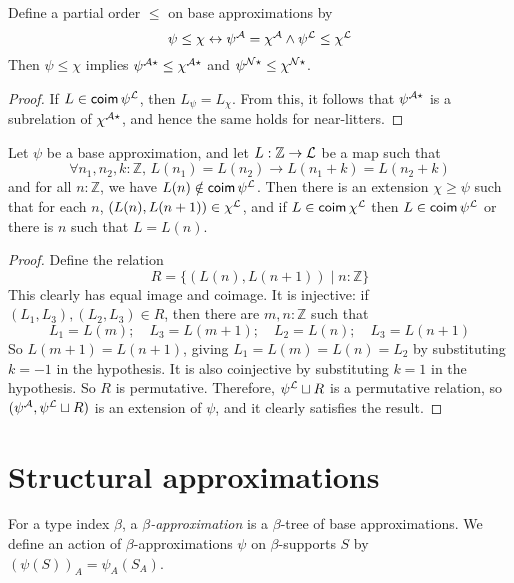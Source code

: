 \begin{proposition}
  Define a partial order \( \leq \) on base approximations by
  \[ \psi \leq \chi \leftrightarrow \psi^{\mathcal A} = \chi^{\mathcal A} \wedge \psi^{\mathcal L} \leq \chi^{\mathcal L} \]
  Then \( \psi \leq \chi \) implies \( \psi^{{\mathcal A}\star} \leq \chi^{{\mathcal A}\star} \) and \( \psi^{{\mathcal N}\star} \leq \chi^{{\mathcal N}\star} \).
\end{proposition}
\begin{proof}
  If \( L \in \operatorname{\mathsf{coim}} \psi^{\mathcal L} \), then \( L_\psi = L_\chi \).
  From this, it follows that \( \psi^{{\mathcal A}\star} \) is a subrelation of \( \chi^{{\mathcal A}\star} \), and hence the same holds for near-litters.
\end{proof}
\begin{proposition}
  Let \( \psi \) be a base approximation, and let \( L : \mathbb Z \to {\mathcal L} \) be a map such that
  \[ \forall n_1, n_2, k : \mathbb Z,\, L(n_1) = L(n_2) \to L(n_1 + k) = L(n_2 + k) \]
  and for all \( n : \mathbb Z \), we have \( L(n) \notin \operatorname{\mathsf{coim}} \psi^{\mathcal L} \).
  Then there is an extension \( \chi \geq \psi \) such that for each \( n \), \( (L(n), L(n+1)) \in \chi^{\mathcal L} \), and if \( L \in \operatorname{\mathsf{coim}} \chi^{\mathcal L} \) then \( L \in \operatorname{\mathsf{coim}} \psi^{\mathcal L} \) or there is \( n \) such that \( L = L(n) \).
\end{proposition}
\begin{proof}
  Define the relation
  \[ R = \{ (L(n), L(n+1)) \mid n : \mathbb Z \} \]
  This clearly has equal image and coimage.
  It is injective: if \( (L_1, L_3), (L_2, L_3) \in R \), then there are \( m, n : \mathbb Z \) such that
  \[ L_1 = L(m);\quad L_3 = L(m + 1);\quad L_2 = L(n);\quad L_3 = L(n + 1) \]
  So \( L(m + 1) = L(n + 1) \), giving \( L_1 = L(m) = L(n) = L_2 \) by substituting \( k = -1 \) in the hypothesis.
  It is also coinjective by substituting \( k = 1 \) in the hypothesis.
  So \( R \) is permutative.
  Therefore, \( \psi^{\mathcal L} \sqcup R \) is a permutative relation, so \( (\psi^{\mathcal A}, \psi^{\mathcal L} \sqcup R) \) is an extension of \( \psi \), and it clearly satisfies the result.
\end{proof}

\section{Structural approximations}
\begin{definition}
  For a type index \( \beta \), a \emph{\( \beta \)-approximation} is a \( \beta \)-tree of base approximations.
  We define an action of \( \beta \)-approximations \( \psi \) on \( \beta \)-supports \( S \) by \( (\psi(S))_A = \psi_A(S_A) \).
\end{definition}
